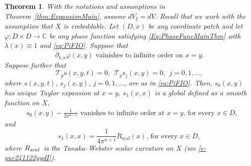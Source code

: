 \documentclass[12pt]{amsart}
\newtheorem{theorem}{Theorem}[section]
\theoremstyle{definition}
\theoremstyle{named}
\numberwithin{equation}{subsection}
\newcommand{\C}{\mathbb{C}}
\newcommand{\ddbar}{\overline\partial}
\begin{document}
\begin{theorem}\label{t-gue241120yyd}
With the notations and assumptions in Theorem~\ref{thm:ExpansionMain}, assume $dV_\xi=dV$. Recall that we work with the assumption that $X$ is embeddable. Let $(D,x)$ be any coordinate patch and let 
$\varphi:D\times D\to\C$ be any phase function satisfying 
\eqref{Eq:PhaseFuncMainThm} with $\lambda(x)\equiv1$ and \eqref{eq:PiFIO}. Suppose that 
\begin{equation}\label{e-gue241120yyd}
\mbox{$\ddbar_{b,x}\varphi(x,y)$ vainishes to infinite order on $x=y$}.
\end{equation}
Suppose further that
\begin{equation}\label{e-gue241120ycdag}
\mathcal{T}_ys(x,y,t)=0, \ \ \mathcal{T}_ys_j(x,y)=0,\ \ j=0,1,\ldots,
\end{equation}
where $s(x,y,t)$, $s_j(x,y)$, $j=0,1,\ldots$, are as in \eqref{eq:PiFIO}. Then, $s_0(x,y)$ has unique Taylor expansion at $x=y$, $s_1(x,x)$ is a global defined as a smooth function on $X$, 
\begin{equation}\label{e-gue241120ycdb}
\begin{split}
&\mbox{$s_0(x,y)-\frac{1}{2\pi^{n+1}}$ vanishes to infinite order at $x=y$, for every $x\in D$}, 
\end{split}
\end{equation}
and
\begin{equation}\label{e-gue201221yydb}
\mbox{$s_1(x,x)=\frac{1}{4\pi^{n+1}}R_{\mathrm{scal}}(x)$, for every $x\in D$}, 
\end{equation}
where $R_{{\rm scal\,}}$ is the Tanaka--Webster scalar curvature on $X$ (see \eqref{e-gue241122yydI}).
\end{theorem} 
\end{document}
